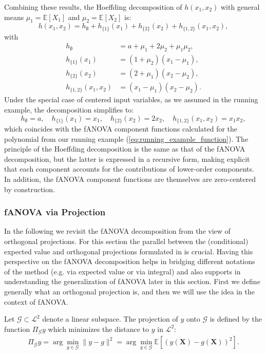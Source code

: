 Combining these results, the Hoeffding decomposition of $h(x_1,x_2)$ with general means 
$\mu_1=\mathbb{E}[X_1]$ and $\mu_2=\mathbb{E}[X_2]$ is:
\[
h(x_1,x_2)
=
h_{\emptyset} + h_{\{1\}}(x_1) + h_{\{2\}}(x_2) + h_{\{1,2\}}(x_1,x_2),
\]
with
\[
\begin{aligned}
h_{\emptyset} &= a + \mu_1 + 2\mu_2 + \mu_1\mu_2, \\[0.3em]
h_{\{1\}}(x_1) &= (1+\mu_2)(x_1 - \mu_1), \\[0.3em]
h_{\{2\}}(x_2) &= (2+\mu_1)(x_2 - \mu_2), \\[0.3em]
h_{\{1,2\}}(x_1,x_2) &= (x_1 - \mu_1)(x_2 - \mu_2).
\end{aligned}
\]
Under the special case of centered input variables, as we assumed in the running example, the decomposition simplifies to:
\[
h_{\emptyset}=a,\quad
h_{\{1\}}(x_1)=x_1,\quad
h_{\{2\}}(x_2)=2x_2,\quad
h_{\{1,2\}}(x_1,x_2)=x_1 x_2,
\]
which coincides with the fANOVA component functions calculated for the polynomial from our running example (\autoref{eq:running_example_function}).
The principle of the Hoeffding decomposition is the same as that of the fANOVA decomposition, but the latter is expressed in a recursive form, making explicit that each component accounts for the contributions of lower-order components.
In addition, the fANOVA component functions are themselves are zero-centered by construction.


\subsubsection{fANOVA via Projection}
In the following we revisit the fANOVA decomposition from the view of orthogonal projections.
For this section the parallel between the (conditional) expected value and orthogonal projections formulated in \cite{Vaart_1998} is crucial.
Having this perspective on the fANOVA decomposition helps in bridging different notations of the method (e.g. via expected value or via integral) and also supports in understanding the generalization of fANOVA later in this section. First we define generally what an orthogonal projection is, and then we will use the idea in the context of fANOVA.

\begin{definition}\label{def:orthogonal_projection}
    Let $\mathcal{G} \subset \mathcal{L}^2$ denote a linear subspace. The projection of $y$ onto $\mathcal{G}$ is defined by the function $\Pi_{\mathcal{G}}y$ which minimizes the distance to $y$ in $\mathcal{L}^2$:
\begin{align}
    \Pi_{\mathcal{G}}y = \arg\min_{g \in \mathcal{G}} \|y - g\|^2
= \arg\min_{g \in \mathcal{G}} \mathbb{E}[(y(\boldsymbol{X}) - g(\boldsymbol{X}))^2].
\end{align}
\end{definition}

